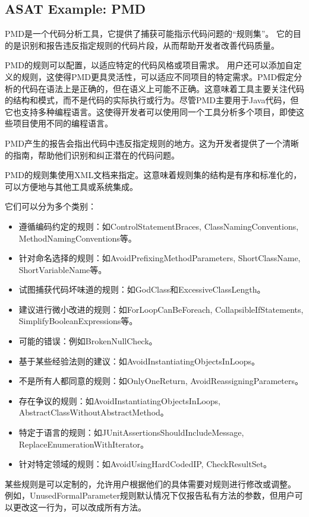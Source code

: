 \subsection{ASAT Example: PMD}

PMD是一个代码分析工具，它提供了捕获可能指示代码问题的“规则集”。
它的目的是识别和报告违反指定规则的代码片段，从而帮助开发者改善代码质量。

PMD的规则可以配置，以适应特定的代码风格或项目需求。
用户还可以添加自定义的规则，这使得PMD更具灵活性，可以适应不同项目的特定需求。PMD假定分析的代码在语法上是正确的，但在语义上可能不正确。这意味着工具主要关注代码的结构和模式，而不是代码的实际执行或行为。尽管PMD主要用于Java代码，但它也支持多种编程语言。这使得开发者可以使用同一个工具分析多个项目，即使这些项目使用不同的编程语言。

PMD产生的报告会指出代码中违反指定规则的地方。这为开发者提供了一个清晰的指南，帮助他们识别和纠正潜在的代码问题。

PMD的规则集使用XML文档来指定。这意味着规则集的结构是有序和标准化的，可以方便地与其他工具或系统集成。

它们可以分为多个类别：
\begin{itemize}
	\item 遵循编码约定的规则：如ControlStatementBraces, ClassNamingConventions, MethodNamingConventions等。
	\item 针对命名选择的规则：如AvoidPrefixingMethodParameters, ShortClassName, ShortVariableName等。
	\item 试图捕获代码坏味道的规则：如GodClass和ExcessiveClassLength。
	\item 建议进行微小改进的规则：如ForLoopCanBeForeach, CollapsibleIfStatements, SimplifyBooleanExpressions等。
	\item 可能的错误：例如BrokenNullCheck。
	\item 基于某些经验法则的建议：如AvoidInstantiatingObjectsInLoops。
	\item 不是所有人都同意的规则：如OnlyOneReturn, AvoidReassigningParameters。
	\item 存在争议的规则：如AvoidInstantiatingObjectsInLoops, AbstractClassWithoutAbstractMethod。
	\item 特定于语言的规则：如JUnitAssertionsShouldIncludeMessage, ReplaceEnumerationWithIterator。
	\item 针对特定领域的规则：如AvoidUsingHardCodedIP, CheckResultSet。
\end{itemize}


某些规则是可以定制的，允许用户根据他们的具体需要对规则进行修改或调整。
例如，UnusedFormalParameter规则默认情况下仅报告私有方法的参数，但用户可以更改这一行为，可以改成所有方法。


